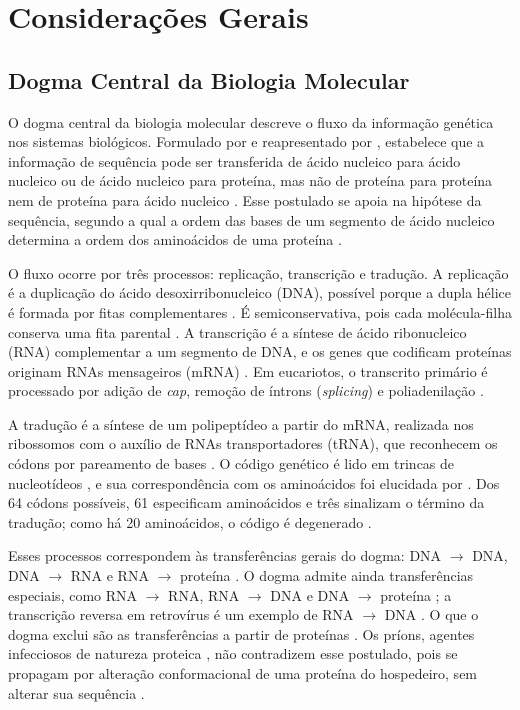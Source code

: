 \chapter{Considerações Gerais}
\label{cap:02}

\section{Dogma Central da Biologia Molecular}

O dogma central da biologia molecular descreve o fluxo da informação genética nos sistemas biológicos. Formulado por  e reapresentado por , estabelece que a informação de sequência pode ser transferida de ácido nucleico para ácido nucleico ou de ácido nucleico para proteína, mas não de proteína para proteína nem de proteína para ácido nucleico \cite{Crick1970}. Esse postulado se apoia na hipótese da sequência, segundo a qual a ordem das bases de um segmento de ácido nucleico determina a ordem dos aminoácidos de uma proteína \cite{Crick1958}.

O fluxo ocorre por três processos: replicação, transcrição e tradução. A replicação é a duplicação do ácido desoxirribonucleico (DNA), possível porque a dupla hélice é formada por fitas complementares \cite{WatsonCrick1953}. É semiconservativa, pois cada molécula-filha conserva uma fita parental \cite{MeselsonStahl1958}. A transcrição é a síntese de ácido ribonucleico (RNA) complementar a um segmento de DNA, e os genes que codificam proteínas originam RNAs mensageiros (mRNA) \cite{Nelson2014}. Em eucariotos, o transcrito primário é processado por adição de \textit{cap}, remoção de íntrons (\textit{splicing}) e poliadenilação \cite{Alberts2017}.

A tradução é a síntese de um polipeptídeo a partir do mRNA, realizada nos ribossomos com o auxílio de RNAs transportadores (tRNA), que reconhecem os códons por pareamento de bases \cite{Nelson2014}. O código genético é lido em trincas de nucleotídeos \cite{Crick1961}, e sua correspondência com os aminoácidos foi elucidada por . Dos 64 códons possíveis, 61 especificam aminoácidos e três sinalizam o término da tradução; como há 20 aminoácidos, o código é degenerado \cite{Nelson2014}.

Esses processos correspondem às transferências gerais do dogma: DNA $\rightarrow$ DNA, DNA $\rightarrow$ RNA e RNA $\rightarrow$ proteína \cite{Crick1970}. O dogma admite ainda transferências especiais, como RNA $\rightarrow$ RNA, RNA $\rightarrow$ DNA e DNA $\rightarrow$ proteína \cite{Crick1970}; a transcrição reversa em retrovírus é um exemplo de RNA $\rightarrow$ DNA \cite{Temin1970, Baltimore1970}. O que o dogma exclui são as transferências a partir de proteínas \cite{Crick1970}. Os príons, agentes infecciosos de natureza proteica \cite{Prusiner1982}, não contradizem esse postulado, pois se propagam por alteração conformacional de uma proteína do hospedeiro, sem alterar sua sequência \cite{Alberts2017}.

